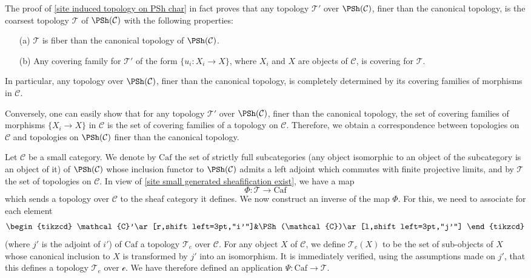 \begin{remark}\label{site topology on PSh finer than canonical char}
The proof of \cref{site induced topology on PSh char} in fact proves that any topology $\mathcal{T}'$ over $\PSh(\mathcal{C})$, finer than the canonical topology, is the coarsest topology $\mathcal{T}$ of $\PSh(\mathcal{C})$ with the following properties:
\begin{itemize}
\item[(a)] $\mathcal{T}$ is fiber than the canonical topology of $\PSh(\mathcal{C})$.
\item[(b)] Any covering family for $\mathcal{T}'$ of the form $\{u_i:X_i\to X\}$, where $X_i$ and $X$ are objects of $\mathcal{C}$, is covering for $\mathcal{T}$.
\end{itemize}
In particular, any topology over $\PSh(\mathcal{C})$, finer than the canonical topology, is completely determined by its covering families of morphisms in $\mathcal{C}$.\par
Conversely, one can easily show that for any topology $\mathcal{T}'$ over $\PSh(\mathcal{C})$, finer than the canonical topology, the set of covering families of morphisms $\{X_i\to X\}$ in $\mathcal{C}$ is the set of covering families of a topology on $\mathcal{C}$. Therefore, we obtain a correspondence between topologies on $\mathcal{C}$ and topologies on $\PSh(\mathcal{C})$ finer than the canonical topology.
\end{remark}
Let $\mathcal{C}$ be a small category. We denote by $\mathrm{Caf}$ the set of strictly full subcategories (any object isomorphic to an object of the subcategory is an object of it) of $\PSh(\mathcal{C})$ whose inclusion functor to $\PSh(\mathcal{C})$ admits a left adjoint which commutes with finite projective limits, and by $\mathscr{T}$ the set of topologies on $\mathcal{C}$. In view of \cref{site small generated sheafification exist}, we have a map
\[\Phi:\mathscr{T}\to \mathrm{Caf}\]
which sends a topology over $\mathcal{C}$ to the sheaf category it defines. We now construct an inverse of the map $\Phi$. For this, we need to associate for each element
\[
\begin{tikzcd}
\mathcal{C}'\ar[r,shift left=3pt,"i'"]&\PSh(\mathcal{C})\ar[l,shift left=3pt,"j'"]
\end{tikzcd}
\]
(where $j'$ is the adjoint of $i'$) of $\mathrm{Caf}$ a topology $\mathcal{T}_e$ over $\mathcal{C}$. For any object $X$ of $\mathcal{C}$, we define $\mathcal{T}_e(X)$ to be the set of sub-objects of $X$ whose canonical inclusion to $X$ is transformed by $j'$ into an isomorphism. It is immediately verified, using the assumptions made on $j'$, that this defines a topology $\mathcal{T}_e$ over $\mathcal{c}$. We have therefore defined an application $\Psi:\mathrm{Caf}\to \mathscr{T}$.

